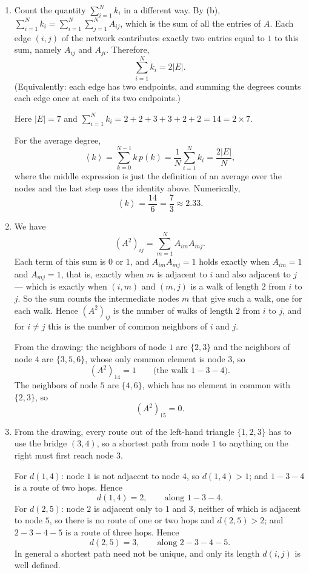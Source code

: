 \documentclass[a4paper,12pt]{article}
\begin{document}
\begin{enumerate}[label=(\alph*)]
\item Count the quantity $\sum_{i=1}^{N} k_i$ in a different way. By (b), $\sum_{i=1}^{N} k_i = \sum_{i=1}^{N} \sum_{j=1}^{N} A_{ij}$, which is the sum of all the entries of $A$. Each edge $(i,j)$ of the network contributes exactly two entries equal to $1$ to this sum, namely $A_{ij}$ and $A_{ji}$. Therefore,
\[ \sum_{i=1}^{N} k_i = 2\left| E \right| . \]
(Equivalently: each edge has two endpoints, and summing the degrees counts each edge once at each of its two endpoints.)

Here $\left| E \right| = 7$ and $\sum_{i=1}^{N} k_i = 2+2+3+3+2+2 = 14 = 2 \times 7$. \checkmark

For the average degree,
\[ \left\langle k \right\rangle = \sum_{k=0}^{N-1} k\,p(k) = \frac{1}{N}\sum_{i=1}^{N} k_i = \frac{2\left| E \right|}{N} , \]
where the middle expression is just the definition of an average over the nodes and the last step uses the identity above. Numerically,
\[ \left\langle k \right\rangle = \frac{14}{6} = \frac{7}{3} \approx 2.33 . \]

\item We have
\[ \left( A^2 \right)_{ij} = \sum_{m=1}^{N} A_{im}A_{mj} . \]
Each term of this sum is $0$ or $1$, and $A_{im}A_{mj}=1$ holds exactly when $A_{im}=1$ and $A_{mj}=1$, that is, exactly when $m$ is adjacent to $i$ and also adjacent to $j$ --- which is exactly when $(i,m)$ and $(m,j)$ is a walk of length $2$ from $i$ to $j$. So the sum counts the intermediate nodes $m$ that give such a walk, one for each walk. Hence $\left( A^2 \right)_{ij}$ is the number of walks of length $2$ from $i$ to $j$, and for $i \neq j$ this is the number of common neighbors of $i$ and $j$.

From the drawing: the neighbors of node $1$ are $\{2,3\}$ and the neighbors of node $4$ are $\{3,5,6\}$, whose only common element is node $3$, so
\[ \left( A^2 \right)_{14} = 1 \qquad\text{(the walk } 1-3-4 \text{)} . \]
The neighbors of node $5$ are $\{4,6\}$, which has no element in common with $\{2,3\}$, so
\[ \left( A^2 \right)_{15} = 0 . \]

\item From the drawing, every route out of the left-hand triangle $\{1,2,3\}$ has to use the bridge $(3,4)$, so a shortest path from node $1$ to anything on the right must first reach node $3$.

For $d(1,4)$: node $1$ is not adjacent to node $4$, so $d(1,4)>1$; and $1-3-4$ is a route of two hops. Hence
\[ d(1,4)=2, \qquad\text{along } 1-3-4 . \]
For $d(2,5)$: node $2$ is adjacent only to $1$ and $3$, neither of which is adjacent to node $5$, so there is no route of one or two hops and $d(2,5)>2$; and $2-3-4-5$ is a route of three hops. Hence
\[ d(2,5)=3, \qquad\text{along } 2-3-4-5 . \]
In general a shortest path need not be unique, and only its length $d(i,j)$ is well defined.


\end{enumerate}
\end{document}
